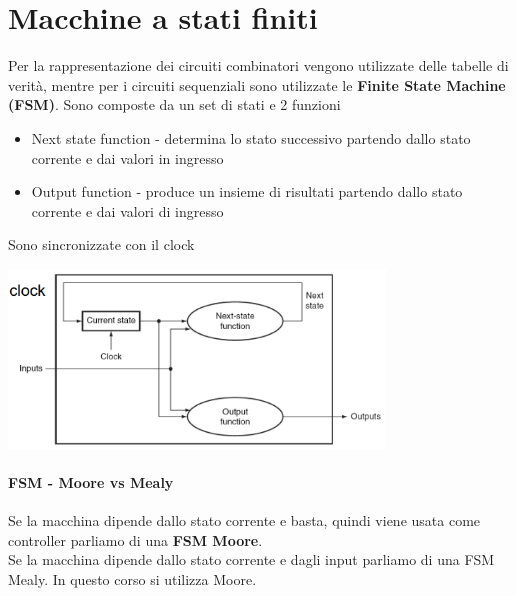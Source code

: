 \documentclass[12pt, a4paper, openany]{book}
\begin{document}
\section{Macchine a stati finiti}
Per la rappresentazione dei circuiti combinatori vengono utilizzate 
delle tabelle di verità, mentre per i circuiti sequenziali sono utilizzate le 
\textbf{Finite State Machine (FSM)}.
Sono composte da un set di stati e 2 funzioni 
\begin{itemize}
    \item Next state function - determina lo stato successivo partendo dallo stato corrente
    e dai valori in ingresso
    \item Output function - produce un insieme di risultati partendo dallo stato corrente
    e dai valori di ingresso
\end{itemize}
Sono sincronizzate con il clock
\begin{center}
    \includegraphics[width=100mm, scale=0.5]{FSM.png}
\end{center}
\paragraph*{FSM - Moore vs Mealy}
Se la macchina dipende dallo stato corrente e basta, quindi viene usata come controller
parliamo di una \textbf{FSM Moore}.
\\ Se la macchina dipende dallo stato corrente e dagli input parliamo di una FSM Mealy.
In questo corso si utilizza Moore.

\end{document}
